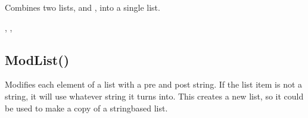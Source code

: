 \documentclass[letterpaper,10pt,english]{sphinxmanual}
\begin{document}
\sphinxAtStartPar
{}

\sphinxAtStartPar
Combines two lists,  and , into a single list.

\sphinxAtStartPar
{}

\begin{sphinxVerbatim}[commandchars=\\\{\}]
\end{sphinxVerbatim}

\sphinxAtStartPar
{}

\begin{sphinxVerbatim}[commandchars=\\\{\}]
\PYG{p}{[}\PYG{p}{]}\PYG{p}{[}\PYG{p}{]}
\end{sphinxVerbatim}

\sphinxAtStartPar
{}

\sphinxAtStartPar
\sphinxcode{\sphinxupquote{{[} {]}()}}, , 

\ignorespaces 

\subsection{ModList()}
\label{\detokenize{reference/pebllist:modlist}}\label{\detokenize{reference/pebllist:index-10}}
\sphinxAtStartPar
{}

\sphinxAtStartPar
{}

\sphinxAtStartPar
Modifies each element of a list with a pre\sphinxhyphen{} and post\sphinxhyphen{} string. If the list item is not a string, it will use whatever string it turns into.  This creates a new list, so it could be used to make a copy of a string\sphinxhyphen{}based list.

\sphinxAtStartPar
{}
\end{document}
